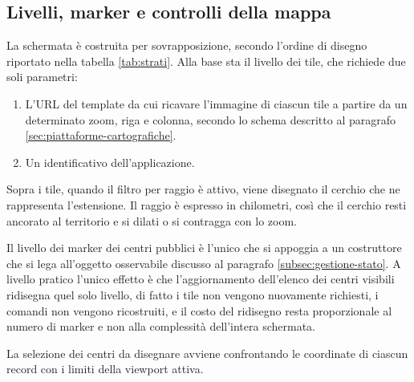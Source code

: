 \subsection{Livelli, marker e controlli della mappa}\label{subsec:impl-marker}

La schermata è costruita per sovrapposizione, secondo l'ordine di disegno riportato nella tabella \ref{tab:strati}.
Alla base sta il livello dei tile, che richiede due soli parametri:

\begin{enumerate}
  \item L'URL del template da cui ricavare l'immagine di ciascun tile a
  partire da un determinato zoom, riga e colonna, secondo lo schema descritto al paragrafo \ref{sec:piattaforme-cartografiche}.
  \item Un identificativo dell'applicazione.
\end{enumerate}

Sopra i tile, quando il filtro per raggio è attivo, viene disegnato il cerchio che ne rappresenta l'estensione.
Il raggio è espresso in chilometri, così che il cerchio resti ancorato al territorio e si dilati o
si contragga con lo zoom.%

Il livello dei marker dei centri pubblici è l'unico che si appoggia a un costruttore che si lega all'oggetto osservabile
discusso al paragrafo \ref{subsec:gestione-stato}.
A livello pratico l'unico effetto è che l'aggiornamento dell'elenco dei centri visibili ridisegna quel solo livello,
di fatto i tile non vengono nuovamente richiesti, i comandi non vengono ricostruiti, e il costo del ridisegno resta
proporzionale al numero di marker e non alla complessità dell'intera schermata.

La selezione dei centri da disegnare avviene confrontando le coordinate di ciascun record con i limiti della viewport attiva.
%

